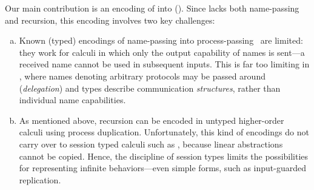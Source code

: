 Our main contribution is 
an encoding of \HOp into \HO ().  
Since \HO lacks 
both name-passing and recursion, this encoding involves two key challenges:
\begin{enumerate}[a.]
\item Known (typed) encodings of name-passing into process-passing~\cite[Ch.13]{SaWabook} are limited: %
they work for %
calculi 
in which only the output capability of names is sent---a received name cannot be used in subsequent inputs.
This is far too limiting in \HOp, where 
 names denoting arbitrary protocols may be passed around (\emph{delegation})
and types describe  communication  \emph{structures}, rather than individual name capabilities. %

\item As mentioned above, 
recursion %
can be encoded in untyped higher-order calculi using process duplication. 
Unfortunately, this kind of encodings do not carry over to session typed calculi such as \HOp,
because linear abstractions cannot be copied. Hence, the discipline of session types  limits 
the possibilities for representing infinite behaviors---even simple forms, such as input-guarded replication.
\end{enumerate}





